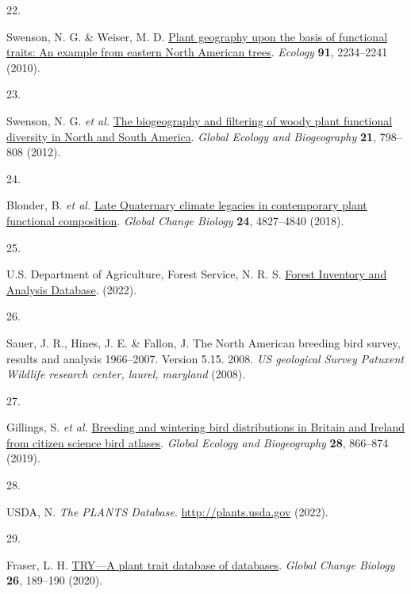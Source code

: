 \documentclass[
  10pt,
]{article}
\newlength{\cslhangindent}
\newlength{\csllabelwidth}
\newlength{\cslentryspacingunit} %
\newenvironment{CSLReferences}[2] %
 {%
  \setlength{\parindent}{0pt}
  \ifodd #1
  \let\oldpar\par
  \def\par{\hangindent=\cslhangindent\oldpar}
  \fi
  \setlength{\parskip}{#2\cslentryspacingunit}
 }%
 {}
\newcommand{\CSLLeftMargin}[1]{\parbox[t]{\csllabelwidth}{#1}}
\newcommand{\CSLRightInline}[1]{\parbox[t]{\linewidth - \csllabelwidth}{#1}\break}
\begin{document}
\begin{CSLReferences}{0}{0}
\leavevmode{}%
\CSLLeftMargin{22. }
\CSLRightInline{Swenson, N. G. \& Weiser, M. D. \href{https://doi.org/10.1890/09-1743.1}{{Plant geography upon the basis of functional traits: An example from eastern North American trees}}. \emph{Ecology} \textbf{91}, 2234--2241 (2010).}

\leavevmode{}%
\CSLLeftMargin{23. }
\CSLRightInline{Swenson, N. G. \emph{et al.} \href{https://doi.org/10.1111/J.1466-8238.2011.00727.X}{{The biogeography and filtering of woody plant functional diversity in North and South America}}. \emph{Global Ecology and Biogeography} \textbf{21}, 798--808 (2012).}

\leavevmode{}%
\CSLLeftMargin{24. }
\CSLRightInline{Blonder, B. \emph{et al.} \href{https://doi.org/10.1111/GCB.14375}{{Late Quaternary climate legacies in contemporary plant functional composition}}. \emph{Global Change Biology} \textbf{24}, 4827--4840 (2018).}

\leavevmode{}%
\CSLLeftMargin{25. }
\CSLRightInline{U.S. Department of Agriculture, Forest Service, N. R. S. \href{https://apps.fs.usda.gov/fia/datamart/CSV/datamart_csv.html}{{Forest Inventory and Analysis Database}}. (2022).}

\leavevmode{}%
\CSLLeftMargin{26. }
\CSLRightInline{Sauer, J. R., Hines, J. E. \& Fallon, J. {The North American breeding bird survey, results and analysis 1966--2007. Version 5.15. 2008}. \emph{US geological Survey Patuxent Wildlife research center, laurel, maryland} (2008).}

\leavevmode{}%
\CSLLeftMargin{27. }
\CSLRightInline{Gillings, S. \emph{et al.} \href{https://doi.org/10.1111/GEB.12906}{{Breeding and wintering bird distributions in Britain and Ireland from citizen science bird atlases}}. \emph{Global Ecology and Biogeography} \textbf{28}, 866--874 (2019).}

\leavevmode{}%
\CSLLeftMargin{28. }
\CSLRightInline{USDA, N. \emph{{The PLANTS Database}}. \url{http://plants.usda.gov} (2022).}

\leavevmode{}%
\CSLLeftMargin{29. }
\CSLRightInline{Fraser, L. H. \href{https://doi.org/10.1111/GCB.14869}{{TRY---A plant trait database of databases}}. \emph{Global Change Biology} \textbf{26}, 189--190 (2020).}


\end{CSLReferences}
\end{document}
